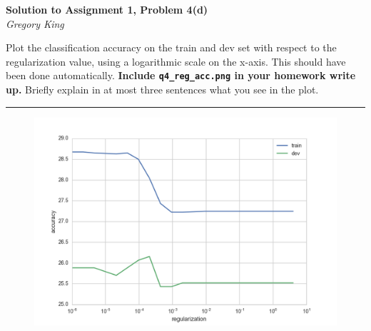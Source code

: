 \documentclass[letter,12pt]{article}
\newcommand{\myhwtitle}[3]
{\begin{center}
{\large {\bf Solution to Assignment {#1}, Problem {#2}}}\\
\medskip 
{\it {#3}} %
\end{center}}
\begin{document}


\clearpage

\myhwtitle{1}{4(d)}{Gregory King}

\bigskip
\noindent Plot the classification accuracy on the train and dev set with respect to the regularization value, using a logarithmic scale on the x-axis. This should have been done automatically. \textbf{Include \texttt{q4\_reg\_acc.png} in your homework write up.} Briefly explain in at most three sentences what you see in the plot.\vspace{5mm}

\noindent\rule{\textwidth}{0.4pt}\vspace{5mm}

\begin{figure}[!h!p]
\begin{center}
\includegraphics[scale=0.5]{../q4_reg_v_acc.png}
\end{center}
\end{figure}


\end{document}
